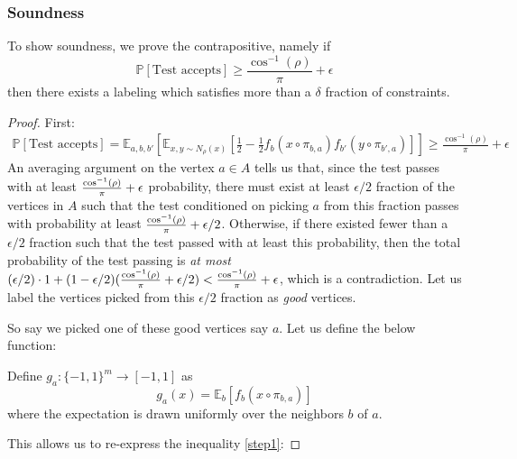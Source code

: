 \subsubsection{Soundness}
To show soundness, we prove the contrapositive, namely if
$$ \mathbb{P}[\text{Test accepts}] \geq \frac{\cos^{-1}(\rho)}{\pi} + \epsilon $$
then there exists a labeling which satisfies more than a $\delta$ fraction of constraints.
%
\begin{proof}
First:
\begin{align} \label{step1}
  \mathbb{P}[\text{Test accepts}] = \mathbb{E}_{a,b,b'}\left[
  \mathbb{E}_{x,y\sim N_{\rho}(x)}\left[
  \frac{1}{2} - \frac{1}{2}f_b(x \circ \pi_{b,a})f_{b'}(y \circ \pi_{b',a})\right]\right] \geq \frac{\cos^{-1}(\rho)}{\pi} + \epsilon
\end{align}
An averaging argument on the vertex $a \in A$ tells us that, since the test passes with at least $\frac{\cos^{-1}(\rho)}{\pi} + \epsilon$ probability, there must exist at least $\epsilon/2$ fraction of the vertices in $A$ such that the test conditioned on picking $a$ from this fraction passes with probability at least $\frac{\cos^{-1}(\rho)}{\pi} + \epsilon/2$. Otherwise, if there existed fewer than a $\epsilon/2$ fraction such that the test passed with at least this probability, then the total probability of the test passing is \emph{at most} $(\epsilon/2)\cdot 1 + (1 - \epsilon/2)(\frac{\cos^{-1}(\rho)}{\pi} + \epsilon/2) < \frac{\cos^{-1}(\rho)}{\pi} + \epsilon$, which is a contradiction. Let us label the vertices picked from this $\epsilon/2$ fraction as \emph{good} vertices. \newline

So say we picked one of these good vertices say $a$. Let us define the below function:

\begin{definition}
  Define $g_a: \{-1,1\}^m \rightarrow [-1,1]$ as
  \begin{equation}
    g_a(x) = \mathbb{E}_{b}\left[f_b(x \circ \pi_{b,a}) \right]
  \end{equation}
  where the expectation is drawn uniformly over the neighbors $b$ of $a$.
\end{definition}
%
This allows us to re-express the inequality \ref{step1}:


\end{proof}
